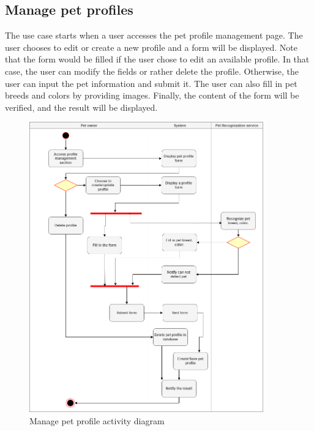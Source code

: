 \subsection{Manage pet profiles}
The use case starts when a user accesses the pet profile management page. The user chooses to edit or create a new profile and a form will be displayed. Note that the form would be filled if the user chose to edit an available profile. In that case, the user can modify the fields or rather delete the profile. Otherwise, the user can input the pet information and submit it. The user can also fill in pet breeds and colors by providing images. Finally, the content of the form will be verified, and the result will be displayed.
\begin{figure}[H]
  \centering
  \includegraphics[width=0.9\textwidth]{Figures/manage_pet.png}
  \caption{Manage pet profile activity diagram}
  \label{fig:manage-pet}
\end{figure}
\newpage


